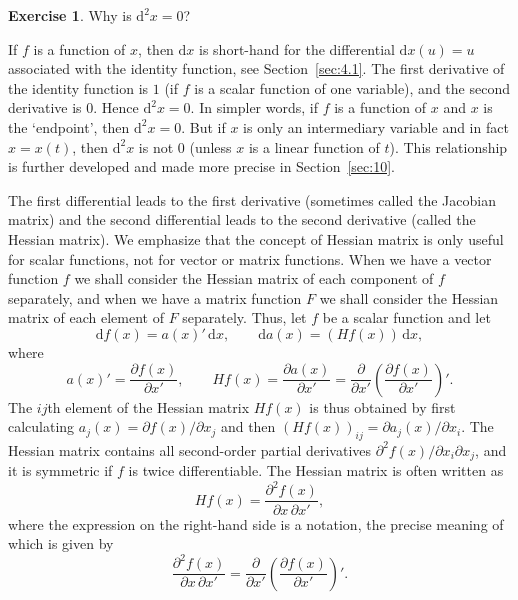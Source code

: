 \documentclass[12pt,a4paper]{article}
\makeatletter
\theoremstyle{definition}
\newtheorem{exercise}{Exercise}
\renewenvironment{proof}[1][\proofname]{\par
  \pushQED{\qed}%
  \normalfont \topsep6\p@\@plus6\p@\relax
  \trivlist
  \item[\hskip\labelsep\bfseries #1\@addpunct{.}]\ignorespaces
}{%
  \popQED\endtrivlist\@endpefalse
}
\newenvironment{solution}{%
  \begin{proof}[Solution]%
}{%
  \end{proof}%
}
\newcommand{\dd}{\mathrm{d}}
\makeatother
\begin{document}
\begin{exercise}\label{exer:24}
Why is $\dd^2 x = 0$?
\end{exercise}

\begin{solution}
If $f$ is a function of $x$, then $\dd x$ is short-hand for the differential $\dd x(u) = u$ associated with the identity function, see Section~\ref{sec:4.1}. The first derivative of the identity function is $1$ (if $f$ is a scalar function of one variable), and the second derivative is $0$. Hence $\dd^2 x = 0$. In simpler words, if $f$ is a function of $x$ and $x$ is the `endpoint', then $\dd^2 x = 0$. But if $x$ is only an intermediary variable and in fact $x = x(t)$, then $\dd^2 x$ is not $0$ (unless $x$ is a linear function of $t$). This relationship is further developed and made more precise in Section~\ref{sec:10}. %
\end{solution}

The first differential leads to the first derivative (sometimes called the Jacobian matrix) and the second differential leads to the second derivative (called the Hessian matrix). We emphasize that the concept of Hessian matrix is only useful for scalar functions, not for vector or matrix functions. When we have a vector function $f$ we shall consider the Hessian matrix of each component of $f$ separately, and when we have a matrix function $F$ we shall consider the Hessian matrix of each element of $F$ separately. %
Thus, let $f$ be a scalar function and let
\begin{equation}\label{eq:37}
\dd f(x) = a(x)'\, \dd x, \qquad \dd a(x) = (Hf(x))\, \dd x,
\end{equation}
where
\[
a(x)' = \frac{\partial f(x)}{\partial x'}, \qquad
Hf(x) = \frac{\partial a(x)}{\partial x'} = \frac{\partial}{\partial x'} \left(\frac{\partial f(x)}{\partial x'}\right)'.
\]
The $ij$th element of the Hessian matrix $Hf(x)$ is thus obtained by first calculating $a_j(x) = \partial f(x)/\partial x_j$ and then $(Hf(x))_{ij} = \partial a_j(x)/\partial x_i$. The Hessian matrix contains all second-order partial derivatives $\partial^2 f(x)/\partial x_i \partial x_j$, and it is symmetric if $f$ is twice differentiable. The Hessian matrix is often written as
\begin{equation}\label{eq:38}
Hf(x) = \frac{\partial^2 f(x)}{\partial x\, \partial x'},
\end{equation}
where the expression on the right-hand side is a notation, the precise meaning of which is given by
\begin{equation}\label{eq:39}
\frac{\partial^2 f(x)}{\partial x\, \partial x'} = \frac{\partial}{\partial x'} \left(\frac{\partial f(x)}{\partial x'}\right)'.
\end{equation}
\end{document}
